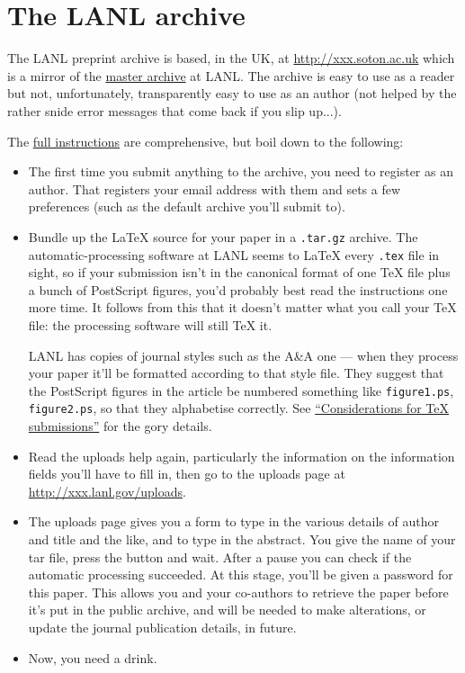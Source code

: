 \documentclass[11pt,oneside,chapters]{starlink}
\begin{document}
\section{The LANL archive}
\label{s:lanl}

The LANL preprint archive is based, in the UK, at
\url{http://xxx.soton.ac.uk} which is a mirror of the
\href{http://xxx.lanl.gov}{master archive} at
LANL.  The archive is easy to use as a reader but not,
unfortunately, transparently easy to use as an author (not
helped by the rather snide error messages that come back if
you slip up...).

The \href{http://xxx.soton.ac.uk/help/}{full instructions}
are comprehensive, but boil down to
the following:

\begin{itemize}
\item
The first time you submit
anything to the archive, you need to register as an
author.  That registers your email address with them and
sets a few preferences (such as the default archive you'll
submit to).

\item
Bundle up the LaTeX source for
your paper in a \texttt{.tar.gz} archive.  The
automatic-processing software at LANL seems to LaTeX every
\texttt{.tex} file in sight, so if your submission
isn't in the canonical format of one TeX file plus a bunch
of PostScript figures, you'd probably best read the
instructions one more time.  It follows from this that it
doesn't matter what you call your TeX file: the processing
software will still TeX it.

LANL has copies of
journal styles such as the A\&A one --- when they
process your paper it'll be formatted according to that
style file.  They suggest that the PostScript figures in
the article be numbered something like
\texttt{figure1.ps}, \texttt{figure2.ps}, so that
they alphabetise correctly.  See
\href{http://xxx.soton.ac.uk/help/submit_tex}{``Considerations for TeX submissions''}
for the gory details.

\item
Read the uploads help again,
particularly the information on the information fields
you'll have to fill in, then go to the uploads page at
\url{http://xxx.lanl.gov/uploads}.

\item
The uploads page gives you a form to type in the various
details of author and title and the like, and to type in
the abstract.  You give the name of your tar file, press
the button and wait.  After a pause you can check if the
automatic processing succeeded.  At this stage, you'll be
given a password for this paper.  This allows you and your
co-authors to retrieve the paper before it's put in the
public archive, and will be needed to make alterations, or
update the journal publication details, in
future.

\item
Now, you need a drink.
\end{itemize}
\end{document}
